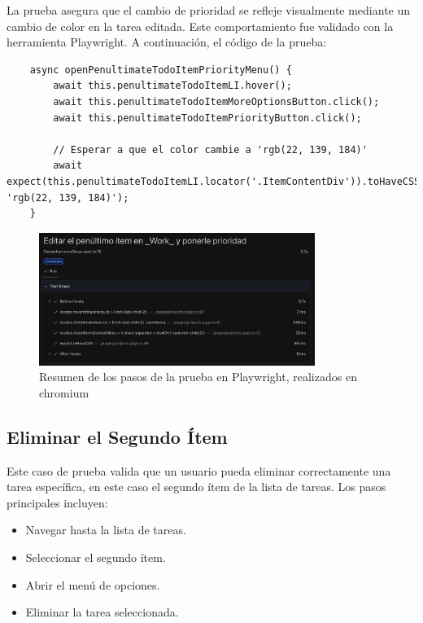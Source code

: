 \documentclass{report}
\begin{document}
La prueba asegura que el cambio de prioridad se refleje visualmente mediante un cambio de color en la tarea editada. Este comportamiento fue validado con la herramienta Playwright. A continuación, el código de la prueba:

\begin{lstlisting}
    async openPenultimateTodoItemPriorityMenu() {
        await this.penultimateTodoItemLI.hover();
        await this.penultimateTodoItemMoreOptionsButton.click();
        await this.penultimateTodoItemPriorityButton.click();
    
        // Esperar a que el color cambie a 'rgb(22, 139, 184)'
        await expect(this.penultimateTodoItemLI.locator('.ItemContentDiv')).toHaveCSS('color', 'rgb(22, 139, 184)');
    }
\end{lstlisting}
\begin{figure}[h!]
    \centering
    \includegraphics[width=0.8\textwidth]{./imgs/playwright/Captura de pantalla 2024-11-17 a la(s) 21.49.52.png}
    \caption{Resumen de los pasos de la prueba en Playwright, realizados en chromium}
    \label{fig:tc1playwright}
\end{figure}

\subsection{Eliminar el Segundo Ítem}

Este caso de prueba valida que un usuario pueda eliminar correctamente una tarea específica, en este caso el segundo ítem de la lista de tareas. Los pasos principales incluyen:
\begin{itemize}
    \item Navegar hasta la lista de tareas.
    \item Seleccionar el segundo ítem.
    \item Abrir el menú de opciones.
    \item Eliminar la tarea seleccionada.
\end{itemize}
\end{document}

